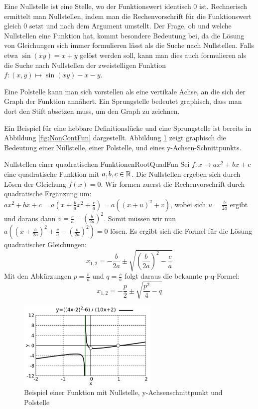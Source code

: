Eine Nullstelle ist eine Stelle, wo der Funktionswert identisch $0$ ist. Rechnerisch ermittelt man Nullstellen, indem man die Rechenvorschrift für die Funktionswert gleich $0$ setzt und nach dem Argument umstellt. Der Frage, ob und welche Nullstellen eine Funktion hat, kommt besondere Bedeutung bei, da die Lösung von Gleichungen sich immer formulieren lässt als die Suche nach Nullstellen. Falls etwa $\sin(xy) = x+y$ gelöst werden soll, kann man dies auch formulieren als die Suche nach Nullstellen der zweistelligen Funktion $f: (x,y) \mapsto \sin(xy)-x-y$.

Eine Polstelle kann man sich vorstellen als eine vertikale Achse, an die sich der Graph der Funktion annähert. Ein Sprungstelle bedeutet graphisch, dass man dort den Stift absetzen muss, um den Graph zu zeichnen.

Ein Beispiel für eine hebbare Definitionslücke und eine Sprungstelle ist bereits in Abbildung \ref{fig:NonContFun} dargestellt. Abbildung \ref{fig:SpecValFun} zeigt graphisch die Bedeutung einer Nullstelle, einer Polstelle, und eines y-Achsen-Schnittpunkts.

\begin{example}{Nullstellen einer quadratischen Funktionen}{RootQuadFun}
    Sei $f: x \to ax^2 + bx +c$ eine quadratische Funktion mit $a,b,c\in\mathbb{R}$. Die Nullstellen ergeben sich durch Lösen der Gleichung $f(x) = 0$. Wir formen zuerst die Rechenvorschrift durch quadratische Ergänzung um: $ax^2 + bx +c = a\left(x + \frac{b}{a}x^2 + \frac{c}{a}\right) = a\left(\left(x+u\right)^2+v\right)$, wobei sich $u=\frac{b}{2a}$ ergibt und daraus dann $v=\frac{c}{a}-\left(\frac{b}{2a}\right)^2$. Somit müssen wir nun $a\left((x+\frac{b}{2a})^2+\frac{c}{a}-\left(\frac{b}{2a}\right)^2\right) = 0$ lösen. Es ergibt sich die Formel für die Lösung quadratischer Gleichungen:
    \begin{equation}
        x_{1,2} = -\frac{b}{2a} \pm \sqrt{\left(\frac{b}{2a}\right)^2 - \frac{c}{a}} \label{eq:RootQuadGen}
    \end{equation}
    Mit den Abkürzungen $p=\frac{b}{a}$ und $q=\frac{c}{a}$ folgt daraus die bekannte p-q-Formel:
    \begin{equation}
        x_{1,2} = -\frac{p}{2} \pm \sqrt{\frac{p^2}{4}-q} \label{eq:RootQuadSpec}
    \end{equation}
\end{example}

\begin{figure}
    \centering
    \includegraphics[width=0.6\textwidth]{./gnuplot/example-special-points}
    \caption[Nullstelle, y-Achsenschnittpunkt und Polstelle]{Beispiel einer Funktion mit Nullstelle, y-Achsenschnittpunkt und Polstelle}
    \label{fig:SpecValFun}
\end{figure}

